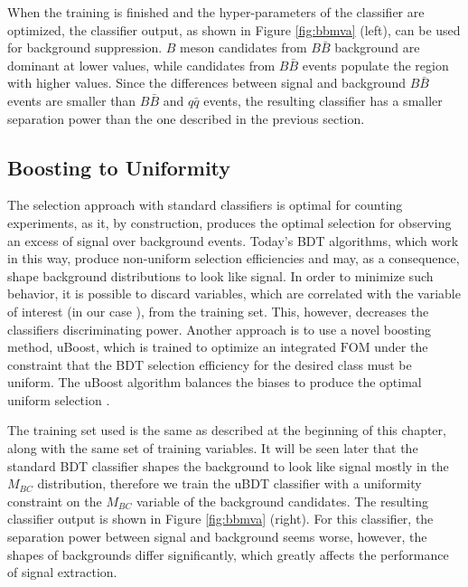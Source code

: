 When the training is finished and the hyper-parameters of the classifier are optimized, the classifier output, as shown in Figure \ref{fig:bbmva} (left), can be used for background suppression. $B$ meson candidates from $B \bar B$ background are dominant at lower values, while candidates from $B \bar B$ events populate the region with higher values. Since the differences between signal and background $B \bar B$ events are smaller than $B \bar B$ and $q \bar q$ events, the resulting classifier has a smaller separation power than the one described in the previous section.

\subsection{Boosting to Uniformity}
The selection approach with standard classifiers is optimal for counting experiments, as it, by construction, produces the optimal selection for observing an excess of signal over background events. Today's BDT algorithms, which work in this way, produce non-uniform selection efficiencies and may, as a consequence, shape background distributions to look like signal. In order to minimize such behavior, it is possible to discard variables, which are correlated with the variable of interest (in our case \vars), from the training set. This, however, decreases the classifiers discriminating power. Another approach is to use a novel boosting method, uBoost, which is trained to optimize an integrated $\mathrm{FOM}$ under the constraint that the BDT selection efficiency for the desired class must be uniform. The uBoost algorithm balances the biases to produce the optimal uniform selection \cite{stevens2013uboost}.

The training set used is the same as described at the beginning of this chapter, along with the same set of training variables. It will be seen later that the standard BDT classifier shapes the background to look like signal mostly in the $M_{BC}$ distribution, therefore we train the uBDT classifier with a uniformity constraint on the $M_{BC}$ variable of the background candidates. The resulting classifier output is shown in Figure \ref{fig:bbmva} (right). For this classifier, the separation power between signal and background seems worse, however, the shapes of backgrounds differ significantly, which greatly affects the performance of signal extraction.

